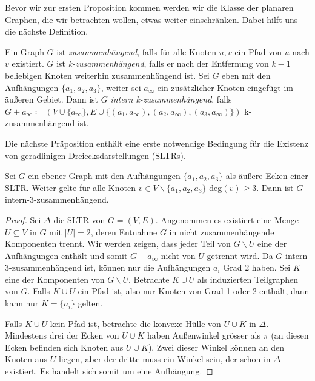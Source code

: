 \begin{example}
\end{example}

Bevor wir zur ersten Proposition kommen werden wir die Klasse der planaren Graphen, die wir betrachten wollen, etwas weiter einschränken. Dabei hilft uns die nächste Definition.

\begin{definition}\label{int_3_con}
Ein Graph $G$ ist \textit{zusammenhängend}, falls für alle Knoten $u,v$ ein Pfad von $u$ nach $v$ existiert. $G$ ist \textit{k-zusammenhängend}, falls er nach der Entfernung von $k-1$ beliebigen Knoten weiterhin zusammenhängend ist. Sei $G$ eben mit den Aufhängungen $\{a_1,a_2,a_3\}$, weiter sei $a_\infty$ ein zusätzlicher Knoten eingefügt im äußeren Gebiet. Dann ist $G$ \textit{intern k-zusammenhängend}, falls $G+a_\infty\coloneqq(V\cup\{a_\infty \},E\cup \{(a_1,a_\infty),(a_2,a_\infty),(a_3,a_\infty)\})$ k-zusammenhängend ist.
\end{definition}

Die nächste Präposition enthält eine erste notwendige Bedingung für die Existenz von geradlinigen Dreiecksdarstellungen (SLTRs).

\begin{proposition}\cite[Proposition 1.2]{af13}
Sei $G$ ein ebener Graph mit den Aufhängungen $\{a_1,a_2,a_3\}$ als äußere Ecken einer SLTR. Weiter gelte für alle Knoten $v\in V \backslash \{a_1,a_2,a_3\}$ deg$(v) \geq 3$. Dann ist $G$ intern-3-zusammenhängend.
\end{proposition}

\begin{proof}
Sei $\Delta$ die SLTR von $G=(V,E)$. Angenommen es existiert eine Menge $U \subseteq V$ in $G$ mit $|U| = 2$, deren Entnahme $G$ in nicht zusammenhängende Komponenten trennt. Wir werden zeigen, dass jeder Teil von $G\backslash U$ eine der Aufhängungen enthält und somit $G + a_\infty$ nicht von $U$ getrennt wird. Da $G$ intern-3-zusammenhängend ist, können nur die Aufhängungen $a_i$ Grad 2 haben. Sei $K$ eine der Komponenten von $G\backslash U$. Betrachte $K\cup U$ als induzierten Teilgraphen von $G$. Falls $K\cup U$ ein Pfad ist, also nur Knoten von Grad 1 oder 2 enthält, dann kann nur $K=\{a_i\}$ gelten.

Falls $K\cup U$ kein Pfad ist, betrachte die konvexe Hülle von $U \cup K$ in $\Delta$. Mindestens drei der Ecken von $U \cup K$ haben Außenwinkel grösser als $\pi$ (an diesen Ecken befinden sich Knoten aus $U \cup K$). Zwei dieser Winkel können an den Knoten aus $U$ liegen, aber der dritte muss ein Winkel sein, der schon in $\Delta$ existiert. Es handelt sich somit um eine Aufhängung.
\end{proof}

